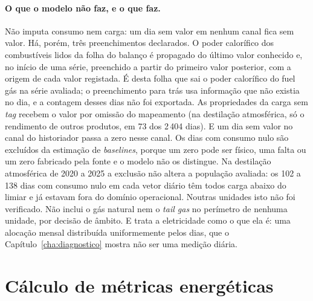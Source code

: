 \paragraph{O que o modelo não faz, e o que faz.} Não imputa consumo nem
carga: um dia sem valor em nenhum canal fica sem valor. Há, porém, três
preenchimentos declarados. O poder calorífico dos combustíveis lidos da
folha do balanço é propagado do último valor conhecido e, no início de uma
série, preenchido a partir do primeiro valor posterior, com a origem de cada
valor registada. É desta folha que sai o poder calorífico do fuel gás na
série avaliada; o preenchimento para trás usa informação que não existia no
dia, e a contagem desses dias não foi exportada. As propriedades da carga
sem \emph{tag} recebem o valor por omissão do mapeamento (na destilação
atmosférica, só o rendimento de outros produtos, em 73 dos 2\,404 dias). E
um dia sem valor no canal do historiador passa a zero nesse canal. Os dias com
consumo nulo são excluídos da estimação de \emph{baselines}, porque um zero
pode ser físico, uma falta ou um zero fabricado pela fonte e o modelo não
os distingue. Na destilação atmosférica de 2020 a 2025 a exclusão não
altera a população avaliada: os 102 a 138 dias com consumo nulo em cada vetor
diário têm todos carga abaixo do limiar e já estavam fora do domínio
operacional. Noutras unidades isto não foi verificado. Não inclui o gás natural nem o
\emph{tail gas} no perímetro de nenhuma unidade, por decisão de âmbito.
E trata a eletricidade como o que ela é: uma alocação mensal distribuída
uniformemente pelos dias, que o Capítulo~\ref{cha:diagnostico} mostra não
ser uma medição diária.

\section{Cálculo de métricas energéticas}
\label{sec:metricas}

